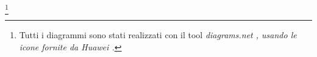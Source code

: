 \documentclass[11pt,oneside,openright,a4paper]{book}
\begin{document}
\frontmatter
\begin{singlespace}
  
  \begin{doublespace}
    
  \end{doublespace}

  \tableofcontents 

  \listoffigures

  \footnote[]{Tutti i diagrammi sono stati realizzati con il tool \it{diagrams.net} \cite{drawio}, usando le icone fornite da Huawei \cite{icons}.}

\end{singlespace}

\mainmatter


















\begin{singlespace}
		
  \clearpage

  
\end{singlespace}



%
\end{document}
